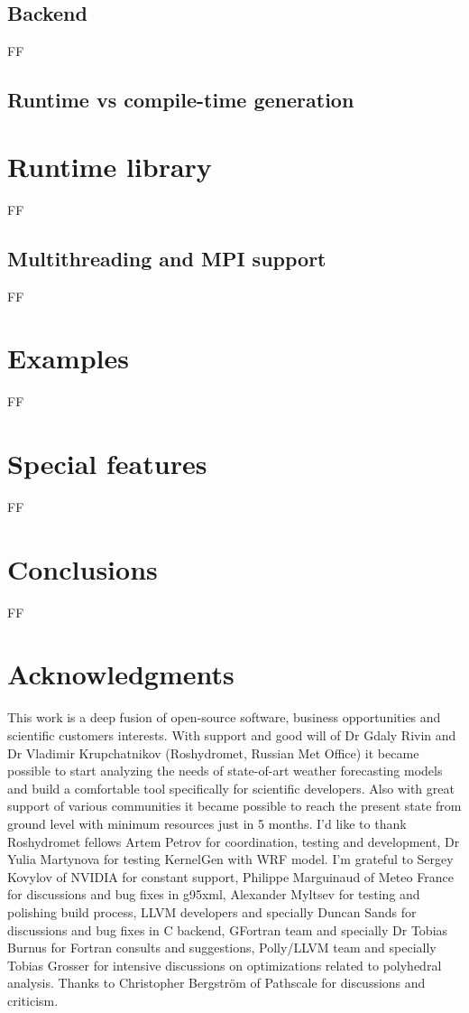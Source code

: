\documentclass[a4,12pt]{article}
\begin{document}
\subsection{Backend}

FF

\subsection{Runtime vs compile-time generation}

\section{Runtime library}

FF

\subsection{Multithreading and MPI support}

FF

\section{Examples}

FF

\section{Special features}

FF

\section{Conclusions}

FF

\section{Acknowledgments}

This work is a deep fusion of open-source software, business opportunities and scientific customers interests. With support and good will of Dr Gdaly Rivin and Dr Vladimir Krupchatnikov (Roshydromet, Russian Met Office) it became possible to start analyzing the needs of state-of-art weather forecasting models and build a comfortable tool specifically for scientific developers. Also with great support of various communities it became possible to reach the present state from ground level with minimum resources just in 5 months. I'd like to thank Roshydromet fellows Artem Petrov for coordination, testing and development, Dr Yulia Martynova for testing KernelGen with WRF model. I'm grateful to Sergey Kovylov of NVIDIA for constant support, Philippe Marguinaud of Meteo France for discussions and bug fixes in g95xml, Alexander Myltsev for testing and polishing build process, LLVM developers and specially Duncan Sands for discussions and bug fixes in C backend, GFortran team and specially Dr Tobias Burnus for Fortran consults and suggestions, Polly/LLVM team and specially Tobias Grosser for intensive discussions on optimizations related to polyhedral analysis. Thanks to Christopher Bergström of Pathscale for discussions and criticism.
\end{document}
